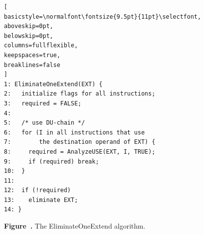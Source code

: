 \par\vspace{1.2em}

\begin{center}
\begin{minipage}{0.52\textwidth}

\begin{lstlisting}[
basicstyle=\normalfont\fontsize{9.5pt}{11pt}\selectfont,
aboveskip=0pt,
belowskip=0pt,
columns=fullflexible,
keepspaces=true,
breaklines=false
]
1: EliminateOneExtend(EXT) {
2:   initialize flags for all instructions;
3:   required = FALSE;
4:
5:   /* use DU-chain */
6:   for (I in all instructions that use
7:        the destination operand of EXT) {
8:     required = AnalyzeUSE(EXT, I, TRUE);
9:     if (required) break;
10:  }
11:
12:  if (!required)
13:    eliminate EXT;
14: }
\end{lstlisting}

\end{minipage}
\end{center}

\vspace{0.8em}

\label{fig:figure7}

\begin{center}
\small\textbf{Figure~\thefigure.} The EliminateOneExtend algorithm.
\end{center}

\par\vspace{1.2em}